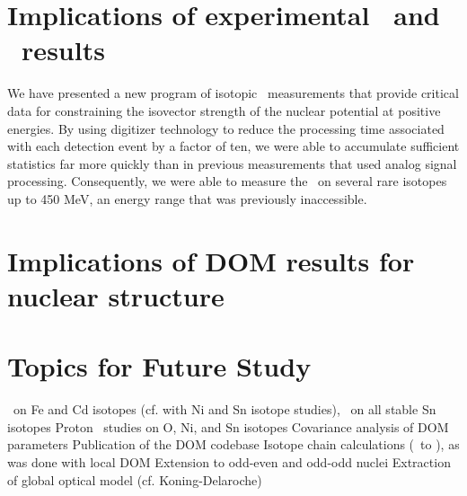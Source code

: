 \section{Implications of experimental \tot\ and \el\ results}
We have presented a new program of isotopic \tot\ measurements that provide critical data for
constraining the isovector strength of the nuclear potential at positive energies. By using
digitizer technology to reduce the processing time associated with each detection event by a factor
of ten, we were able to accumulate sufficient statistics far more quickly than in previous
measurements that used analog signal processing. Consequently, we were able to measure the \tot\ on
several rare isotopes up to 450 MeV, an energy range that was previously inaccessible.

\section{Implications of DOM results for nuclear structure}

\section{Topics for Future Study}
\tot\ on Fe and Cd isotopes (cf. with Ni and Sn isotope studies), \tot\ on all stable Sn isotopes
Proton \rxn\ studies on O, Ni, and Sn isotopes
Covariance analysis of DOM parameters
Publication of the DOM codebase
Isotope chain calculations (\snTwelve\ to \snFour), as was done with local DOM
Extension to odd-even and odd-odd nuclei
Extraction of global optical model (cf. Koning-Delaroche)
